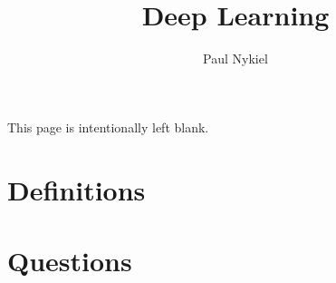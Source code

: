 \documentclass[10pt]{report}
\title{Deep Learning}
\author{Paul Nykiel}
\begin{document}
    \maketitle
    \pagebreak
    This page is intentionally left blank.
    \pagebreak
    \tableofcontents
    \pagebreak
    \chapter{Definitions}
    
    \chapter{Questions}
    
    
    
    
    
    
    
    
    
    
\end{document}
